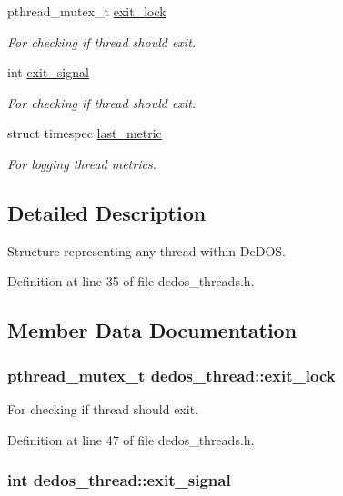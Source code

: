 \begin{DoxyCompactItemize}
pthread\-\_\-mutex\-\_\-t \hyperlink{structdedos__thread_abff71615fe6947f8fed5a26e198b6b4b}{exit\-\_\-lock}
\begin{DoxyCompactList}\small\item\em For checking if thread should exit. \end{DoxyCompactList}\item 
int \hyperlink{structdedos__thread_ae1ad6c5ad2f9c080a1b396a8572e75f5}{exit\-\_\-signal}
\begin{DoxyCompactList}\small\item\em For checking if thread should exit. \end{DoxyCompactList}\item 
struct timespec \hyperlink{structdedos__thread_aa45d04173d89640ec2ddeb95c66db84e}{last\-\_\-metric}
\begin{DoxyCompactList}\small\item\em For logging thread metrics. \end{DoxyCompactList}\end{DoxyCompactItemize}


\subsection{Detailed Description}
Structure representing any thread within De\-D\-O\-S. 

Definition at line 35 of file dedos\-\_\-threads.\-h.



\subsection{Member Data Documentation}
\hypertarget{structdedos__thread_abff71615fe6947f8fed5a26e198b6b4b}{
\subsubsection[{exit\-\_\-lock}]{\setlength{\rightskip}{0pt plus 5cm}pthread\-\_\-mutex\-\_\-t dedos\-\_\-thread\-::exit\-\_\-lock}}\label{structdedos__thread_abff71615fe6947f8fed5a26e198b6b4b}


For checking if thread should exit. 



Definition at line 47 of file dedos\-\_\-threads.\-h.

\hypertarget{structdedos__thread_ae1ad6c5ad2f9c080a1b396a8572e75f5}{
\subsubsection[{exit\-\_\-signal}]{\setlength{\rightskip}{0pt plus 5cm}int dedos\-\_\-thread\-::exit\-\_\-signal}}\label{structdedos__thread_ae1ad6c5ad2f9c080a1b396a8572e75f5}


